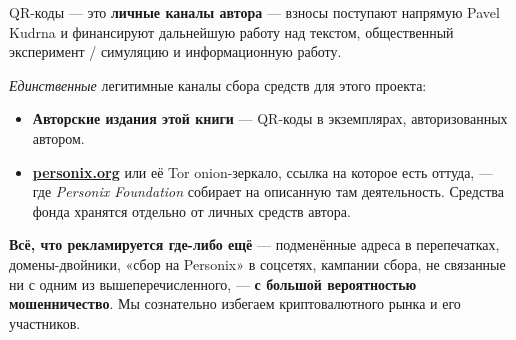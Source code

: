 \begin{minipage}[t]{0.60\textwidth}
\vspace{0pt}
\begin{mdframed}[
  linewidth=0.7pt,roundcorner=5pt,
  innerleftmargin=10pt,innerrightmargin=10pt,
  innertopmargin=8pt,innerbottommargin=8pt,
  skipabove=0pt,skipbelow=0pt,
  linecolor=cbwarning!50,backgroundcolor=cbwarning!5,
  nobreak=true,
  needspace=4\baselineskip,
]
\footnotesize
QR-коды --- это \textbf{личные каналы автора} --- взносы поступают напрямую Pavel Kudrna и финансируют дальнейшую работу над текстом, общественный эксперимент / симуляцию и информационную работу.

\smallskip
\emph{Единственные} легитимные каналы сбора средств для этого проекта:

\smallskip
\begin{itemize}
\setlength{\itemsep}{0pt}
\setlength{\topsep}{0pt}
\item \textbf{Авторские издания этой книги} --- QR-коды в экземплярах, авторизованных автором.
\item \href{https://personix.org}{\textbf{personix.org}} или её Tor onion-зеркало, ссылка на которое есть оттуда, --- где \emph{Personix Foundation} собирает на описанную там деятельность. Средства фонда хранятся отдельно от личных средств автора.
\end{itemize}

\smallskip
\textbf{Всё, что рекламируется где-либо ещё} --- подменённые адреса в перепечатках, домены-двойники, «сбор на Personix» в соцсетях, кампании сбора, не связанные ни с одним из вышеперечисленного, --- \textbf{с большой вероятностью мошенничество}. Мы сознательно избегаем криптовалютного рынка и его участников.
\end{mdframed}
\end{minipage}

\clearpage
